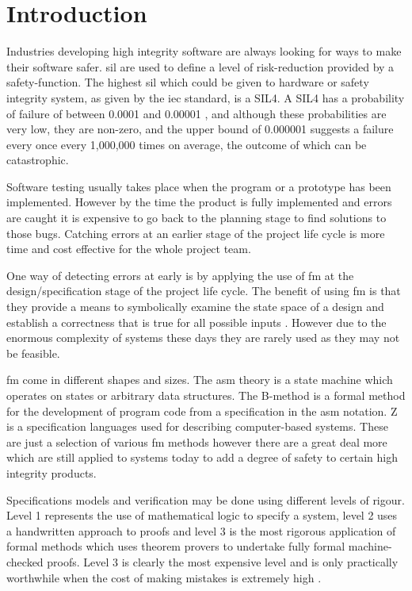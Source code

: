 
\chapter{Introduction}
\label{ch:introduction}

Industries developing high integrity software are always looking for ways to make their software safer. \gls{sil} are used to define a level of risk-reduction provided by a safety-function. The highest \gls{sil} \cite{siliso} which could be given to hardware or safety integrity system, as given by the \gls{iec} \cite{iec} standard, is a SIL4. A SIL4 has a probability of failure of between 0.0001 and 0.00001 \cite{IEC61508}, and although these probabilities are very low, they are non-zero, and the upper bound of 0.000001 suggests a failure every once every 1,000,000 times on average, the outcome of which can be catastrophic.

Software testing usually takes place when the program or a prototype has been implemented. However by the time the product is fully implemented and errors are caught it is expensive to go back to the planning stage to find solutions to those bugs. Catching errors at an earlier stage of the project life cycle is more time and cost effective for the whole project team.

One way of detecting errors at early is by applying the use of \gls{fm} at the design/specification stage of the project life cycle. The benefit of using \gls{fm} is that they provide a means to symbolically examine the state space of a design and establish a correctness that is true for all possible inputs \cite{wifrm}. However due to the enormous complexity of systems these days they are rarely used as they may not be feasible. 

\Gls{fm} come in different shapes and sizes. The \gls{asm} theory \cite{Borger:2003:ASM:829603} is a state machine which operates on states or arbitrary data structures. The B-method \cite{bmeth} is a formal method for the development of program code from a specification in the \gls{asm} notation. Z \cite{spiveyreferencemanual} is a specification languages used for describing computer-based systems. These are just a selection of various \gls{fm} methods however there are a great deal more which are still applied to systems today to add a degree of safety to certain high integrity products.

Specifications models and verification  may be done using different levels of rigour. Level 1 represents the use of mathematical logic to specify a system, level 2 uses a handwritten approach to proofs and level 3 is the most rigorous application of formal methods which uses theorem provers to undertake fully formal machine-checked proofs. Level 3 is clearly the most expensive level and is only practically worthwhile when the cost of making mistakes is extremely high \cite{encyclopedia}.

